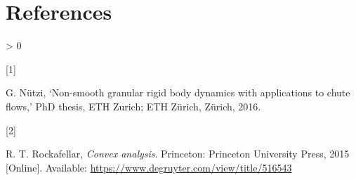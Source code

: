 \documentclass[
  12pt,
  british,
  a4paper,
  twoside,
  titlepage,
  openright,
  numbers=noenddot,
  chapterprefix=true,
  headings=optiontohead,
  svgnames,
  dvipsnames]{scrreprt}
\newlength{\cslhangindent}
\newlength{\csllabelwidth}
\newenvironment{CSLReferences}[3] %
 {%
  \setlength{\parindent}{0pt}
  \ifodd #1 \everypar{\setlength{\hangindent}{\cslhangindent}}\ignorespaces\fi
  \ifnum #2 > 0
  \setlength{\parskip}{#2\baselineskip}
  \fi
 }%
 {}
\newcommand{\CSLLeftMargin}[1]{\parbox[t]{\csllabelwidth}{#1}}
\newcommand{\CSLRightInline}[1]{\parbox[t]{\linewidth - \csllabelwidth}{#1}}
\begin{document}
\hypertarget{references}{%
\chapter*{References}\label{references}}

\hypertarget{refs}{}
\begin{CSLReferences}{0}{0}
\leavevmode\hypertarget{ref-nuetzig_thesis_2016}{}%
\CSLLeftMargin{{[}1{]} }
\CSLRightInline{G. Nützi, {`Non-smooth granular rigid body dynamics with
applications to chute flows,'} PhD thesis, ETH Zurich; ETH Zürich,
Zürich, 2016. }

\leavevmode\hypertarget{ref-rockafellar_convex_2015}{}%
\CSLLeftMargin{{[}2{]} }
\CSLRightInline{R. T. Rockafellar, \emph{Convex analysis}. Princeton:
Princeton University Press, 2015 {[}Online{]}. Available:
\url{https://www.degruyter.com/view/title/516543}}

\end{CSLReferences}
\end{document}
